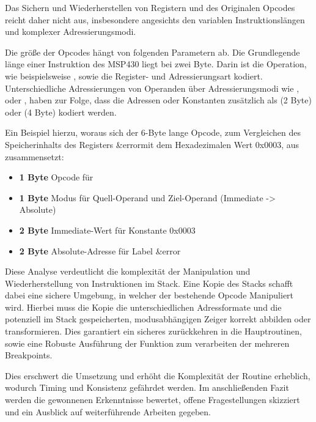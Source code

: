Das Sichern und Wiederherstellen von Registern und des Originalen Opcodes reicht daher nicht aus, insbesondere angesichts den variablen Instruktionsl\"angen und komplexer Adressierungsmodi. 

Die gr\"o{\ss}e der Opcodes h\"angt von folgenden Parametern ab. Die Grundlegende l\"ange einer Instruktion des MSP430 liegt bei zwei Byte. Darin ist die Operation, wie beispielsweise , sowie die Register- und Adressierungsart kodiert. Unterschiedliche Adressierungen von Operanden \"uber Adressierungsmodi wie \glqq {}\grqq , \glqq {} \grqq oder \glqq {}\grqq, haben zur Folge, dass die Adressen oder Konstanten zus\"atzlich als  (2 Byte) oder  (4 Byte) kodiert werden. 

\newpage
Ein Beispiel hierzu, woraus sich der 6-Byte lange Opcode, zum Vergleichen des Speicherinhalts des Registers \glqq \&error\grqq  mit dem Hexadezimalen Wert \glqq 0x0003\grqq, aus  zusammensetzt: 
\\\textbf{} 
\begin{itemize}
	\item \textbf{1 Byte} Opcode f\"ur 
	\item \textbf{1 Byte} Modus f\"ur Quell-Operand und Ziel-Operand (Immediate -> Absolute)
	\item \textbf{2 Byte} Immediate-Wert f\"ur Konstante \glqq 0x0003\grqq
	\item \textbf{2 Byte} Absolute-Adresse f\"ur Label \glqq \&error\grqq
\end{itemize}


Diese Analyse verdeutlicht die komplexit\"at der Manipulation und Wiederherstellung von Instruktionen im Stack. Eine Kopie des Stacks schafft dabei eine sichere Umgebung, in welcher der bestehende Opcode Manipuliert wird. Hierbei muss die Kopie die unterschiedlichen Adressformate und die potenziell im Stack gespeicherten, modusabh\"angigen Zeiger korrekt abbilden oder transformieren. Dies garantiert ein sicheres zur\"uckkehren in die Hauptroutinen, sowie eine Robuste Ausf\"uhrung der Funktion zum verarbeiten der \ggf mehreren Breakpoints.

Dies erschwert die Umsetzung und erh\"oht die Komplexit\"at der Routine erheblich, wodurch Timing und Konsistenz gef\"ahrdet werden. Im anschlie{\ss}enden Fazit werden die gewonnenen Erkenntnisse bewertet, offene Fragestellungen skizziert und ein Ausblick auf weiterf\"uhrende Arbeiten gegeben.

